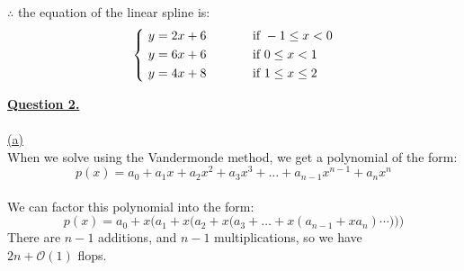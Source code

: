 \documentclass[12pt]{article}
\begin{document}
$\therefore$ the equation of the linear spline is:
$$
    \left\{
        \begin{aligned}
            \ y=2x + 6 & \hspace*{13mm} \text{if } -1 \leq x < 0 \\
            \ y=6x + 6 & \hspace*{13mm} \text{if } 0 \leq x < 1 \\
            \ y=4x + 8 & \hspace*{13mm} \text{if } 1 \leq x \leq 2 \\
        \end{aligned}
    \right.
$$

\newpage
{\LARGE \underline{\textbf{Question 2.}}}\\
~\\\hyperlink{toc}{\hypertarget{2.1}{(a)}}\\
When we solve using the Vandermonde method, we get a polynomial of the form:\\
$$p(x) = a_0 + a_1x + a_2{x}^2 + a_3{x}^3 + \ldots + a_{n-1}{x}^{n-1} + a_{n}{x}^{n}$$\\

We can factor this polynomial into the form:
$$p(x) = a_0 + x\bigg(a_1 + x \Big(a_2 + x\big(a_3 + \ldots + x(a_{n-1} + xa_n) \cdots \big)\Big)\bigg)$$
There are $n-1$ additions, and $n-1$ multiplications, so we have\\
$2n + \mathcal{O}(1)$ flops.



\end{document}
